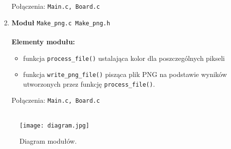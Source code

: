 \documentclass[12pt,a4paper,notitlepage]{report}
\begin{document}
\begin{enumerate}
Połączenia: \verb|Main.c, Board.c|

\item\textbf{Moduł} \verb|Make_png.c Make_png.h|\\
\\
\textbf{Elementy modułu:}
\begin{itemize}
\item funkcja \verb|process_file()| ustalająca kolor dla poszczególnych pikseli
\item funkcja \verb|write_png_file()| pisząca plik PNG na podstawie wyników utworzonych przez funkcję \verb|process_file()|.
\end{itemize}
Połączenia: \verb|Main.c, Board.c|\\
\\
\end{enumerate}
\begin{figure}[h!]
	\texttt{[image: diagram.jpg]}
	\caption{Diagram modułów.}
\end{figure}
\end{document}
